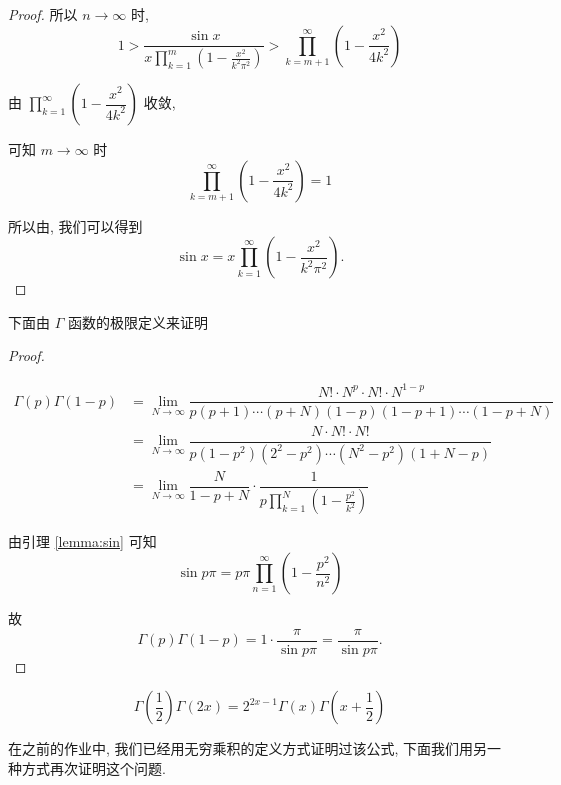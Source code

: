 \begin{proof}
	所以 $n\to \infty$ 时,
	$$1>\dfrac{\sin x}{x\prod\limits_{k=1}^m\left(1-\frac{x^2}{k^2\pi^2}\right)}>\prod\limits_{k=m+1}^\infty\left(1-\dfrac{x^2}{4k^2}\right)$$

	由 $\prod\limits_{k=1}^\infty\left(1-\dfrac{x^2}{4k^2}\right)$ 收敛,

	可知 $m\to \infty$ 时
	$$\prod\limits_{k=m+1}^\infty\left(1-\dfrac{x^2}{4k^2}\right)=1$$

	所以由, 我们可以得到
	$$\sin x=x\prod\limits_{k=1}^\infty\left(1-\dfrac{x^2}{k^2\pi^2}\right).$$
\end{proof}

下面由 $\Gamma$ 函数的极限定义来证明

\begin{proof}
	$\ $
	\begin{center}
		$
		\begin{aligned}
			\Gamma(p)\Gamma(1-p)&=\lim\limits_{N\to \infty}\dfrac{N!\cdot N^p \cdot N! \cdot N^{1-p}}{p(p+1)\cdots(p+N)(1-p)(1-p+1)\cdots(1-p+N)} \\
			&=\lim\limits_{N\to\infty}\dfrac{N\cdot N!\cdot N!}{p(1-p^2)(2^2-p^2)\cdots(N^2-p^2)(1+N-p)} \\
			&=\lim\limits_{N\to \infty}\dfrac{N}{1-p+N}\cdot \dfrac{1}{p\prod\limits_{k=1}^N(1-\frac{p^2}{k^2})}
		\end{aligned}
		$
	\end{center}

	由引理 \ref{lemma:sin} 可知
	$$\sin p\pi=p\pi\prod\limits_{n=1}^\infty\left(1-\dfrac{p^2}{n^2}\right)$$

	故
	$$\Gamma(p)\Gamma(1-p)=1\cdot \dfrac{\pi}{\sin p\pi}=\dfrac{\pi}{\sin p\pi}.$$
\end{proof}

\begin{property}\label{倍元公式}\label{勒让德公式}
	$$\Gamma\left(\frac 1 2\right)\Gamma(2x)=2^{2x-1}\Gamma(x)\Gamma\left(x+\frac 1 2\right)$$
\end{property}

在之前的作业中, 我们已经用无穷乘积的定义方式证明过该公式, 下面我们用另一种方式再次证明这个问题.

